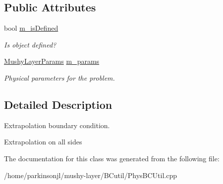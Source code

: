 \subsection*{Public Attributes}
\begin{DoxyCompactItemize}
\item 
\mbox{\label{class_domain_extrap_b_c_function_adc313727aea12d585c4cda5752084a8a}} 
bool \hyperlink{class_domain_extrap_b_c_function_adc313727aea12d585c4cda5752084a8a}{m\+\_\+is\+Defined}
\begin{DoxyCompactList}\small\item\em Is object defined? \end{DoxyCompactList}\item 
\mbox{\label{class_domain_extrap_b_c_function_af988a9999fb0afb7f286c11ae85dc35c}} 
\hyperlink{class_mushy_layer_params}{Mushy\+Layer\+Params} \hyperlink{class_domain_extrap_b_c_function_af988a9999fb0afb7f286c11ae85dc35c}{m\+\_\+params}
\begin{DoxyCompactList}\small\item\em Physical parameters for the problem. \end{DoxyCompactList}\end{DoxyCompactItemize}


\subsection{Detailed Description}
Extrapolation boundary condition. 

Extrapolation on all sides 

The documentation for this class was generated from the following file\+:\begin{DoxyCompactItemize}
\item 
/home/parkinsonjl/mushy-\/layer/\+B\+Cutil/Phys\+B\+C\+Util.\+cpp\end{DoxyCompactItemize}
